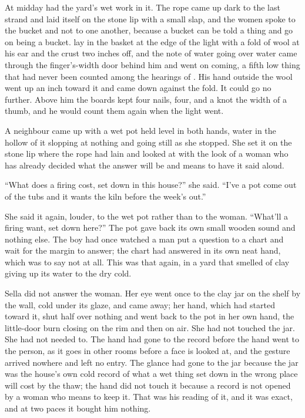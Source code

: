 At midday  had the yard’s wet work in it. The rope came up dark to the last strand and laid itself on the stone lip with a small slap, and the women spoke to the bucket and not to one another, because a bucket can be told a thing and go on being a bucket.  lay in the basket at the edge of the light with a fold of wool at his ear and the crust two inches off, and the note of water going over water came through the finger’s-width door behind him and went on coming, a fifth low thing that had never been counted among the hearings of . His hand outside the wool went up an inch toward it and came down against the fold. It could go no further. Above him the boards kept four nails, four, and a knot the width of a thumb, and he would count them again when the light went.

A neighbour came up with a wet pot held level in both hands, water in the hollow of it slopping at nothing and going still as she stopped. She set it on the stone lip where the rope had lain and looked at  with the look of a woman who has already decided what the answer will be and means to have it said aloud.

“What does a firing cost, set down in this house?” she said. “I’ve a pot come out of the tubs and it wants the kiln before the week’s out.”

She said it again, louder, to the wet pot rather than to the woman. “What’ll a firing want, set down here?” The pot gave back its own small wooden sound and nothing else. The boy had once watched a man put a question to a chart and wait for the margin to answer; the chart had answered in its own neat hand, which was to say not at all. This was that again, in a yard that smelled of clay giving up its water to the dry cold.

Sella did not answer the woman. Her eye went once to the clay jar on the shelf by the wall, cold under its glaze, and came away; her hand, which had started toward it, shut half over nothing and went back to the pot in her own hand, the little-door burn closing on the rim and then on air. She had not touched the jar. She had not needed to. The hand had gone to the record before the hand went to the person, as it goes in other rooms before a face is looked at, and the gesture arrived nowhere and left no entry. The glance had gone to the jar because the jar was the house’s own cold record of what a wet thing set down in the wrong place will cost by the thaw; the hand did not touch it because a record is not opened by a woman who means to keep it. That was his reading of it, and it was exact, and at two paces it bought him nothing.

